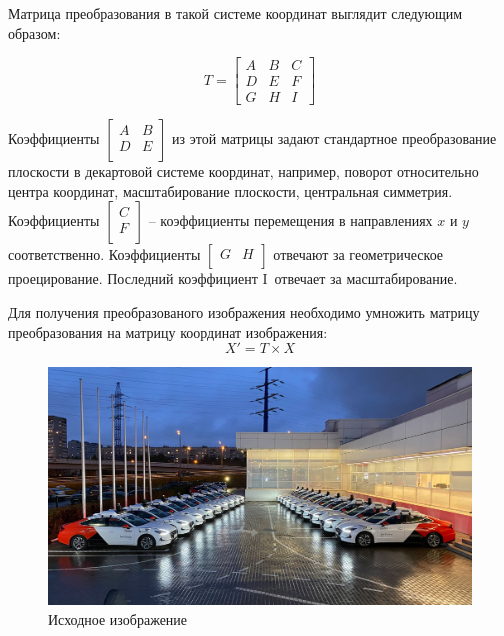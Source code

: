 Матрица преобразования в такой системе координат выглядит следующим образом:

\begin{equation}
    T = \begin{bmatrix}
        A & B & C \\
        D & E & F \\
        G & H & I
    \end{bmatrix}
\end{equation}

{
\renewcommand*{\arraystretch}{0.4}
Коэффициенты $\left[\begin{matrix}A&B\\D&E\\\end{matrix}\right]$ из этой матрицы задают стандартное преобразование плоскости в декартовой системе координат, например, поворот относительно центра координат, масштабирование плоскости, центральная симметрия. 
Коэффициенты $\left[\begin{matrix}C\\F\\\end{matrix}\right]$ – коэффициенты перемещения в направлениях $x$ и $y$ соответственно. 
Коэффициенты  $\left[\begin{matrix}G&H\\\end{matrix}\right]$ отвечают за геометрическое проецирование. 
Последний коэффициент I\ отвечает за масштабирование. 
}

Для получения преобразованого изображения необходимо умножить матрицу преобразования на матрицу координат изображения:
\begin{equation}
    X' = T \times X
\end{equation}

\begin{figure}[ht]
    \includegraphics[width=\textwidth]{../source/image.png}
    \caption{Исходное изображение}
    \label{fig:source_image}
\end{figure}

